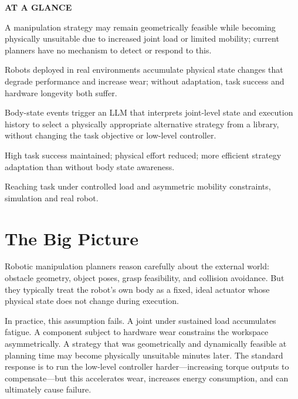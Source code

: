 \documentclass[10pt,twocolumn]{article}
\begin{document}
\begin{mdframed}[backgroundcolor=boxgray,linecolor=rulered,linewidth=1pt,
    innerleftmargin=6pt,innerrightmargin=6pt,
    innertopmargin=6pt,innerbottommargin=6pt]
\textbf{\small AT A GLANCE}\par\vspace{4pt}
\begin{description}[leftmargin=0pt,labelsep=4pt,itemsep=2pt,parsep=0pt,
    font=\small\bfseries]
  \item[Problem:] A manipulation strategy may remain geometrically feasible
    while becoming physically unsuitable due to increased joint load or
    limited mobility; current planners have no mechanism to detect or
    respond to this.
  \item[Why it matters:] Robots deployed in real environments accumulate
    physical state changes that degrade performance and increase wear; without
    adaptation, task success and hardware longevity both suffer.
  \item[Method:] Body-state events trigger an LLM that interprets joint-level
    state and execution history to select a physically appropriate alternative
    strategy from a library, without changing the task objective or low-level
    controller.
  \item[Result:] High task success maintained; physical effort reduced; more
    efficient strategy adaptation than without body state awareness.
  \item[Evidence:] Reaching task under controlled load and asymmetric mobility
    constraints, simulation and real robot.
\end{description}
\end{mdframed}

\section{The Big Picture}

Robotic manipulation planners reason carefully about the external world:
obstacle geometry, object poses, grasp feasibility, and collision avoidance.
But they typically treat the robot's own body as a fixed, ideal actuator
whose physical state does not change during execution.

In practice, this assumption fails. A joint under sustained load accumulates
fatigue. A component subject to hardware wear constrains the workspace
asymmetrically. A strategy that was geometrically and dynamically feasible
at planning time may become physically unsuitable minutes later. The standard
response is to run the low-level controller harder---increasing torque
outputs to compensate---but this accelerates wear, increases energy
consumption, and can ultimately cause failure.
\end{document}

